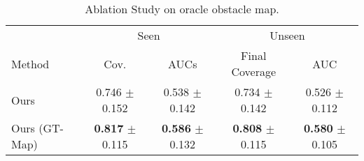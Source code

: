 \begin{table}[htbp]
\centering
\begin{tabular}{lcc|cc}
\toprule
& \multicolumn{2}{c|}{Seen} & \multicolumn{2}{c}{Unseen} \\
\multirow{-2}{*}{Method} & Cov. & AUCs & Final Coverage & AUC \\
\midrule
Ours & 0.746 $\pm$ 0.152 & 0.538 $\pm$ 0.142 & 0.734 $\pm$ 0.142 & 0.526 $\pm$ 0.112 \\
Ours (GT-Map) & \textbf{0.817} $\pm$ 0.115 & \textbf{0.586} $\pm$ 0.132 & \textbf{0.808} $\pm$ 0.115 & \textbf{0.580} $\pm$ 0.105 \\
\bottomrule
\end{tabular}
\caption{{Ablation Study on oracle obstacle map.}}
\label{tab:ablation1}
\end{table}